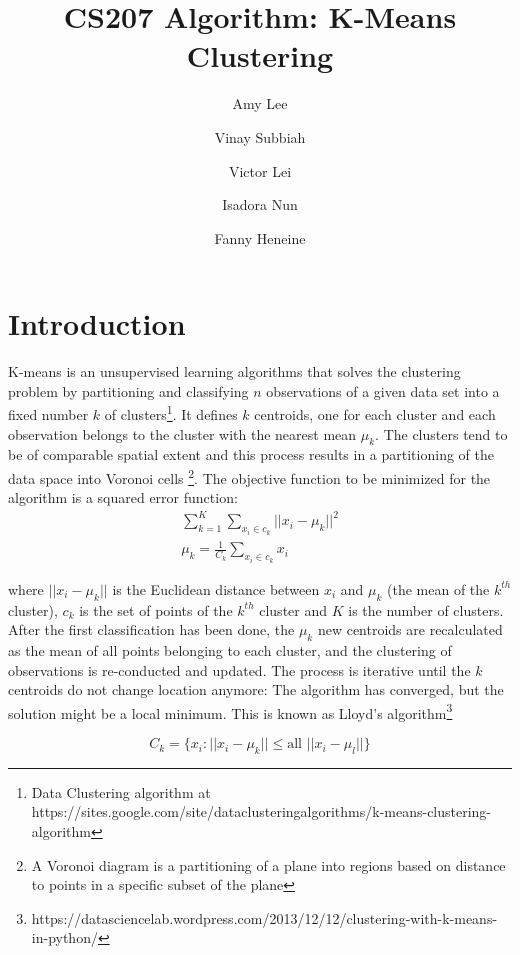 \documentclass[11pt]{article}
\title{CS207 Algorithm: K-Means Clustering}
\author{Amy Lee \and Vinay Subbiah \and Victor Lei \and Isadora Nun \and Fanny Heneine}
\begin{document}
\maketitle{}

\pagestyle{plain}

\section*{Introduction}
K-means is an unsupervised learning algorithms that solves the clustering problem by partitioning and classifying $n$ observations of a given data set into a fixed number $k$ of clusters\footnote{Data Clustering algorithm at https://sites.google.com/site/dataclusteringalgorithms/k-means-clustering-algorithm}.
It defines $k$ centroids, one for each cluster and each observation belongs to the cluster with the nearest mean $\mu_k$. The clusters tend to be of comparable spatial extent and this process results in a partitioning of the data space into Voronoi cells \footnote{A Voronoi diagram is a partitioning of a plane into regions based on distance to points in a specific subset of the plane}. The objective function to be minimized for the algorithm is a squared error function:
\begin{gather}
\sum_{k=1}^{K}\sum_{x_i \in c_k}\Big|\Big|x_i-\mu_k\Big|\Big|^2 \\
\mu_k=\frac{1}{C_k}\sum_{x_i \in c_k} x_i
\end{gather}

\noindent where $\big|\big|x_i-\mu_k\big|\big|$ is the Euclidean distance between $x_i$ and $\mu_k$ (the mean of the $k^{th}$ cluster), $c_k$ is the set of points of the $k^{th}$ cluster and $K$ is the number of clusters. \\


\noindent After the first classification has been done, the $\mu_k$ new centroids are recalculated as the mean of all points belonging to each cluster, and the clustering of observations is re-conducted and updated. The process is iterative until the $k$ centroids do not change location anymore: The algorithm has converged, but the solution might be a local minimum. This is known as Lloyd’s algorithm\footnote{https://datasciencelab.wordpress.com/2013/12/12/clustering-with-k-means-in-python/}


\begin{equation}
C_k=\{x_i: \big|\big|x_i-\mu_k\big|\big| \leq \text{all } \big|\big|x_i-\mu_l\big|\big|\}
\end{equation}
\end{document}
